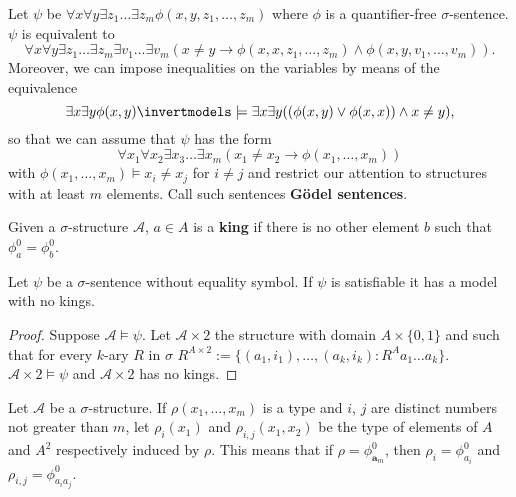 Let $\psi$ be $\forall x \forall y \exists z_1 \ldots \exists z_m \phi(x,y,z_1, \ldots, z_m)$ where $\phi$ is a quantifier-free $\sigma$-sentence. 
$\psi$ is equivalent to 
$$\forall x \forall y \exists z_1 \ldots \exists z_m \exists v_1 \ldots \exists v_m(x \neq y \rightarrow \phi(x,x,z_1, \ldots, z_m) \land \phi(x,y,v_1, \ldots, v_m))\text{.}$$ 
Moreover, we can impose inequalities on the variables by means of the equivalence 
$$\exists x \exists y \phi(x,y) \invertmodels \models \exists x \exists y ((\phi(x,y) \lor \phi(x,x)) \land x \neq y)\text{,}$$
so that we can assume that $\psi$ has the form 
\begin{equation} 
\label{godel_sent}
\forall x_1 \forall x_2 \exists x_3 \ldots \exists x_m (x_1 \neq x_2 \rightarrow \phi(x_1, \ldots, x_m) )
\end{equation}
with $\phi(x_1, \ldots, x_m) \models x_i \neq x_j$ for $i \neq j$ and restrict our attention to structures with at least $m$ elements. 
Call such sentences \textbf{G\"odel sentences}. 

\begin{defn} Given a $\sigma$-structure $\mathcal{A}$, $a \in A$ is a \textbf{king} if there is no other element $b$ such that $\phi^0 _a = \phi^0_b$. 
\end{defn}

\begin{lem} Let $\psi$ be a $\sigma$-sentence without equality symbol.
If $\psi$ is satisfiable it has a model with no kings. 
\begin{proof} Suppose $\mathcal{A} \models \psi$. 
Let $\mathcal{A} \times 2$ the structure with domain $A \times \{0,1\}$ and such that for every $k$-ary $R$ in $\sigma$ $R^{A\times 2}:=\{(a_1, i_1), \ldots, (a_k, i_k): R^A a_1 \ldots a_k\}$. 
$\mathcal{A} \times 2 \models \psi$ and $\mathcal{A} \times 2$ has no kings.
\end{proof}
\end{lem}

Let $\mathcal{A}$ be a $\sigma$-structure. 
If $\rho(x_1, \ldots, x_m)$ is a type and $i$, $j$ are distinct numbers not greater than $m$, let $\rho_i(x_1)$ and $\rho_{i,j}(x_1, x_2)$ be the type of elements of $A$ and $A^2$ respectively induced by $\rho$. 
This means that if $\rho=\phi^0 _{\mathbf{a}_m}$, then $\rho_i=\phi^0 _{a_i}$ and $\rho_{i,j}=\phi^0 _{a_i a_j}$. 

